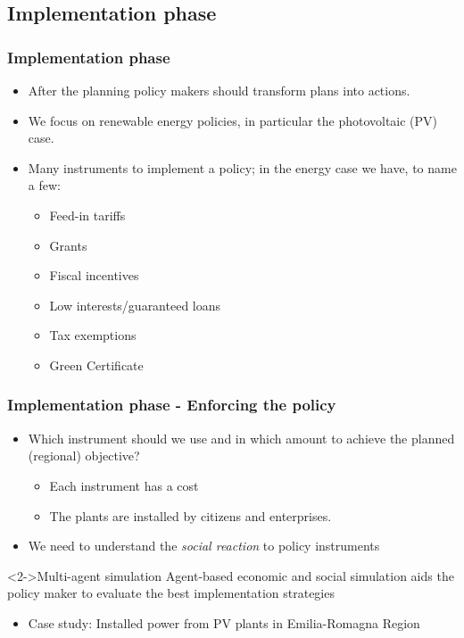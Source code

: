 \documentclass{beamer}
\begin{document}
\subsection{Implementation phase}
	\begin{frame}
	\frametitle{Implementation phase}
		\begin{itemize}
			\item After the planning policy makers should transform plans into actions.
			\item We focus on renewable energy policies, in particular the photovoltaic (PV) case.
			\item Many instruments to implement a policy; in the energy case we have, to name a few:
			\begin{itemize}
				\item<1-| alert@2> Feed-in tariffs 
				\item<1-| alert@3> Grants
				\item<1-| alert@3> Fiscal incentives
				\item<1-| alert@3> Low interests/guaranteed loans
				\item<1-> Tax exemptions
				\item<1-> Green Certificate
			\end{itemize}
		\end{itemize}
	\end{frame}
	
	\begin{frame}
	\frametitle{Implementation phase - Enforcing the policy}
		\begin{itemize}
		\item Which instrument should we use and in which amount to achieve the planned (regional) objective?
			\begin{itemize}
				\item Each instrument has a cost
				\item The plants are installed by citizens and enterprises.
			\end{itemize}
		\item We need to understand the \emph{social reaction} to policy instruments
		\end{itemize}
		\begin{block}<2->{Multi-agent simulation}
		Agent-based economic and social simulation aids the policy maker to evaluate the best implementation strategies 
		\begin{itemize}
			\item Case study: Installed power from PV plants in Emilia-Romagna Region 
		\end{itemize}
		\end{block}
	\end{frame}
	
\end{document}
